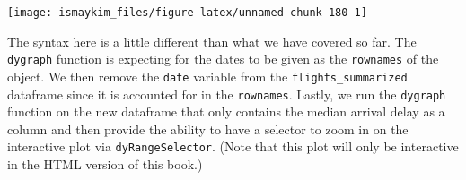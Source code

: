 \documentclass[]{tufte-book}
\begin{document}
\begin{center}\texttt{[image: ismaykim\_files/figure-latex/unnamed-chunk-180-1]} \end{center}

The syntax here is a little different than what we have covered so far.
The \texttt{dygraph} function is expecting for the dates to be given as
the \texttt{rownames} of the object. We then remove the \texttt{date}
variable from the \texttt{flights\_summarized} dataframe since it is
accounted for in the \texttt{rownames}. Lastly, we run the
\texttt{dygraph} function on the new dataframe that only contains the
median arrival delay as a column and then provide the ability to have a
selector to zoom in on the interactive plot via
\texttt{dyRangeSelector}. (Note that this plot will only be interactive
in the HTML version of this book.)

\renewcommand{\bibname}{References}

% 
% 
\end{document}
